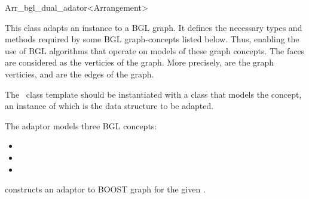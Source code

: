 
\ccRefPageBegin

\begin{ccRefClass}{Arr_bgl_dual_adator<Arrangement>}
    
\ccDefinition

This class adapts an  instance to a BGL graph. It defines 
the necessary types and methods required by some BGL graph-concepts listed 
below. Thus, enabling the use of BGL algorithms that operate on models of
these graph concepts. The  faces are considered as the 
verticies of the graph. More precisely,  
are the graph verticies, and  are the 
edges of the graph.

The \ccClassTemplateName\ class template should be instantiated with a 
class that models the  concept, an instance of which is 
the data structure to be adapted.

The adaptor models three BGL concepts:
\begin{itemize}
\item {}
\item {}
\item {}
\end{itemize}


\ccCreation
{}
    
    {constructs an adaptor to BOOST graph for the given .}
    
\ccSeeAlso
    \\

\end{ccRefClass}

\ccRefPageEnd
